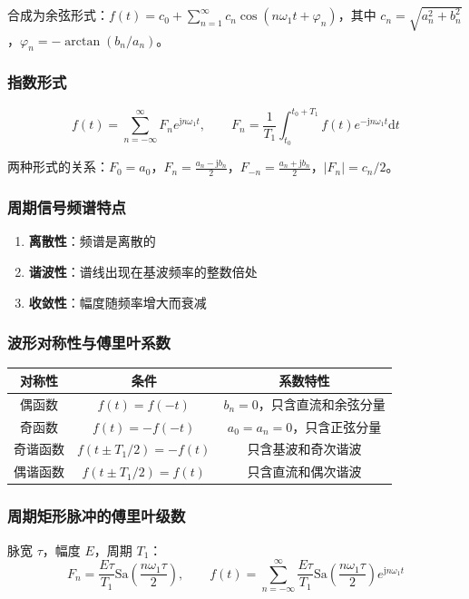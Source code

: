 \documentclass[11pt,a4paper]{ctexart}
\newcommand{\jj}{\mathrm{j}}            %
\newcommand{\dd}{\mathrm{d}}            %
\newcommand{\Sa}{\mathrm{Sa}}           %
\begin{document}
合成为余弦形式：$f(t) = c_0 + \sum_{n=1}^{\infty} c_n\cos(n\omega_1 t + \varphi_n)$，其中 $c_n = \sqrt{a_n^2 + b_n^2}$，$\varphi_n = -\arctan(b_n/a_n)$。

\subsubsection{指数形式}
\[
f(t) = \sum_{n=-\infty}^{\infty} F_n e^{\jj n\omega_1 t},\qquad
F_n = \frac{1}{T_1}\int_{t_0}^{t_0+T_1} f(t)e^{-\jj n\omega_1 t}\dd t
\]

两种形式的关系：$F_0 = a_0$，$F_n = \frac{a_n - \jj b_n}{2}$，$F_{-n} = \frac{a_n + \jj b_n}{2}$，$|F_n| = c_n/2$。

\subsubsection{周期信号频谱特点}
\begin{enumerate}
    \item \textbf{离散性}：频谱是离散的
    \item \textbf{谐波性}：谱线出现在基波频率的整数倍处
    \item \textbf{收敛性}：幅度随频率增大而衰减
\end{enumerate}

\subsubsection{波形对称性与傅里叶系数}

\begin{tabular}{c|c|c}
\toprule
对称性 & 条件 & 系数特性 \\
\midrule
偶函数 & $f(t) = f(-t)$ & $b_n = 0$，只含直流和余弦分量 \\
奇函数 & $f(t) = -f(-t)$ & $a_0 = a_n = 0$，只含正弦分量 \\
奇谐函数 & $f(t \pm T_1/2) = -f(t)$ & 只含基波和奇次谐波 \\
偶谐函数 & $f(t \pm T_1/2) = f(t)$ & 只含直流和偶次谐波 \\
\bottomrule
\end{tabular}

\subsubsection{周期矩形脉冲的傅里叶级数}
脉宽 $\tau$，幅度 $E$，周期 $T_1$：
\[
F_n = \frac{E\tau}{T_1}\Sa\!\left(\frac{n\omega_1\tau}{2}\right),\qquad
f(t) = \sum_{n=-\infty}^{\infty} \frac{E\tau}{T_1}\Sa\!\left(\frac{n\omega_1\tau}{2}\right) e^{\jj n\omega_1 t}
\]
\end{document}
